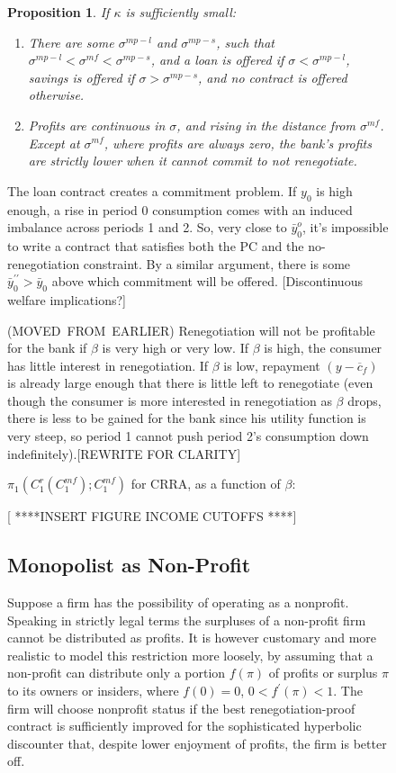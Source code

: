 \documentclass[11pt]{article}%
\newtheorem{proposition}{Proposition}
\begin{document}
\begin{figure}
{\begin{proposition}
If $\kappa$ is sufficiently small:

\begin{enumerate}
\item There are some $\sigma^{mp-l}$ and $\sigma^{mp-s}$, such that
$\sigma^{mp-l}<\sigma^{mf}<\sigma^{mp-s}$, and a loan is offered if
$\sigma<\sigma^{mp-l}$, savings is offered if $\sigma>\sigma^{mp-s}$, and no
contract is offered otherwise.

\item Profits are continuous in $\sigma$, and rising in the distance from
$\sigma^{mf}$. Except at $\sigma^{mf}$, where profits are always zero, the
bank's profits are strictly lower when it cannot commit to not renegotiate.
\end{enumerate}
\end{proposition}

The loan contract creates a commitment problem. If $y_{0}$ is high enough, a
rise in period 0 consumption comes with an induced imbalance across periods 1
and 2. So, very close to $\bar{y}_{0}^{o}$, it's impossible to write a
contract that satisfies both the PC and the no-renegotiation constraint. By a
similar argument, there is some $\bar{y}_{0}^{\prime\prime}>\bar{y}_{0}$ above
which commitment will be offered. [Discontinuous welfare implications?]

(MOVED\ FROM\ EARLIER) Renegotiation will not be profitable for the bank if $\beta$ is very high or
very low. If $\beta$ is high, the consumer has little interest in
renegotiation. If $\beta$ is low, repayment $(y-\overline{c}_{f})$ is already
large enough that there is little left to renegotiate (even though the
consumer is more interested in renegotiation as $\beta$ drops, there is less
to be gained for the bank since his utility function is very steep, so period
1 cannot push period 2's consumption down indefinitely).[REWRITE FOR CLARITY]

$\pi_{1}\left(  C_{1}^{r}\left(  C_{1}^{mf}\right)  ;C_{1}^{mf}\right)  $ for
CRRA, as a function of $\beta$:

[ ****INSERT FIGURE INCOME CUTOFFS ****]


\subsection{Monopolist as Non-Profit}

Suppose a firm has the possibility of operating as a nonprofit. Speaking in
strictly legal terms the surpluses of a non-profit firm cannot be distributed
as profits. It is however customary and more realistic to model this
restriction more loosely, by assuming that a non-profit can distribute only a
portion $f\left(  \pi\right)  $ of profits or surplus $\pi$ to its owners or
insiders, where $f\left(  0\right)  =0$, $0<f^{\prime}\left(  \pi\right)  <1$.
The firm will choose nonprofit status if the best renegotiation-proof contract
is sufficiently improved for the sophisticated hyperbolic discounter that,
despite lower enjoyment of profits, the firm is better off.

}
\end{figure}
\end{document}
